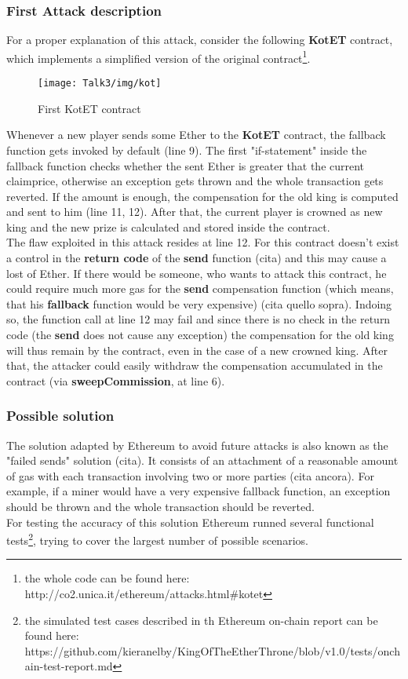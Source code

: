 \subsubsection{First Attack description}
For a proper explanation of this attack, consider the following \textbf{KotET} contract, which implements a simplified version of the original contract\footnote{the whole code can be found here: http://co2.unica.it/ethereum/attacks.html\#kotet}.   
\begin{figure}[H]
\begin{center}
\texttt{[image: Talk3/img/kot]}
\end{center}
\caption{First KotET contract}
\label{label}
\end{figure}
Whenever a new player sends some Ether to the \textbf{KotET} contract, the fallback function gets invoked by default (line 9). The first "if-statement" inside the fallback function checks whether the sent Ether is greater that the current claimprice, otherwise an exception gets thrown and the whole transaction gets reverted. If the amount is enough, the compensation for the old king is computed and sent to him (line 11, 12). After that, the current player is crowned as new king and the new prize is calculated and stored inside the contract\cite{paper2}. \\
The flaw exploited in this attack resides at line 12. For this contract doesn't exist a control in the \textbf{return code} of the \textbf{send} function (cita) %
and this may cause a lost of Ether.
If there would be someone, who wants to attack this contract, he could require much more gas for the \textbf{send} compensation function (which means, that his \textbf{fallback} function would be very expensive) (cita quello sopra). Indoing so, the function call at line 12 may fail and since there is no check in the return code (the \textbf{send} does not cause any exception) the compensation for the old king will thus remain by the contract, even in the case of a new crowned king. 
After that, the attacker could easily withdraw the compensation accumulated in the contract (via \textbf{sweepCommission}, at line 6).  

\subsubsection{Possible solution}
The solution adapted by Ethereum to avoid future attacks is also known as the "failed sends" solution (cita). It consists of an attachment of a reasonable amount of gas with each transaction involving two or more parties (cita ancora). 
For example, if a miner would have a very expensive fallback function, an exception should be thrown and the whole transaction should be reverted. \\ For testing the accuracy of this solution Ethereum runned several functional tests\footnote{the simulated test cases described in th Ethereum on-chain report can be found here: https://github.com/kieranelby/KingOfTheEtherThrone/blob/v1.0/tests/onchain-test-report.md}, trying to cover the largest number of possible scenarios. 


